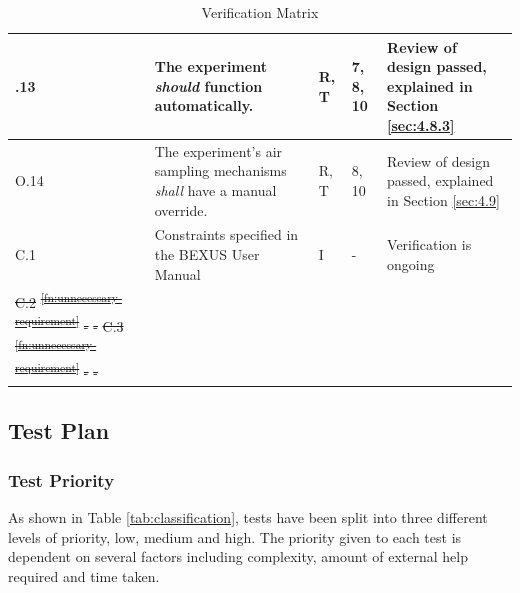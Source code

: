\documentclass[a4paper,12pt,twoside]{article}
\providecommand{\DIFaddtex}[1]{{\protect\color{blue}\uwave{#1}}} %
\providecommand{\DIFdeltex}[1]{{\protect\color{red}\sout{#1}}}                      %
\providecommand{\DIFaddbegin}{} %
\providecommand{\DIFaddend}{} %
\providecommand{\DIFdelbegin}{} %
\providecommand{\DIFdelend}{} %
\providecommand{\DIFadd}[1]{\texorpdfstring{\DIFaddtex{#1}}{#1}} %
\providecommand{\DIFdel}[1]{\texorpdfstring{\DIFdeltex{#1}}{}} %
\newcommand{\DIFscaledelfig}{0.5}
\newlength{\DIFdelgraphicswidth} %
\newlength{\DIFdelgraphicsheight} %
\newcommand{\DIFaddincludegraphics}[2][]{{\color{blue}\fbox{\DIFOincludegraphics[#1]{#2}}}} %
\newcommand{\DIFdelincludegraphics}[2][]{%
\sbox{\DIFdelgraphicsbox}{\DIFOincludegraphics[#1]{#2}}%
\settoboxwidth{\DIFdelgraphicswidth}{\DIFdelgraphicsbox} %
\settoboxtotalheight{\DIFdelgraphicsheight}{\DIFdelgraphicsbox} %
\scalebox{\DIFscaledelfig}{%
\parbox[b]{\DIFdelgraphicswidth}{\usebox{\DIFdelgraphicsbox}\\[-\baselineskip] \rule{\DIFdelgraphicswidth}{0em}}\llap{\resizebox{\DIFdelgraphicswidth}{\DIFdelgraphicsheight}{%
\setlength{\unitlength}{\DIFdelgraphicswidth}%
\begin{picture}(1,1)%
\thicklines\linethickness{2pt} %
{\color[rgb]{1,0,0}\put(0,0){\framebox(1,1){}}}%
{\color[rgb]{1,0,0}\put(0,0){\line( 1,1){1}}}%
{\color[rgb]{1,0,0}\put(0,1){\line(1,-1){1}}}%
\end{picture}%
}\hspace*{3pt}}} %
} %
\DeclareRobustCommand{\DIFaddbegin}{\DIFOaddbegin \let\includegraphics\DIFaddincludegraphics} %
\DeclareRobustCommand{\DIFaddend}{\DIFOaddend \let\includegraphics\DIFOincludegraphics} %
\DeclareRobustCommand{\DIFdelbegin}{\DIFOdelbegin \let\includegraphics\DIFdelincludegraphics} %
\DeclareRobustCommand{\DIFdelend}{\DIFOaddend \let\includegraphics\DIFOincludegraphics} %
\begin{document}
\begin{longtable}[]{|m{}| m{} |m{} |m{}|m{}|}
\DIFadd{O}\DIFaddend .13 & The experiment \textit{should} function automatically.                                                           &      R, T        & 7, 8, 10            &    Review of design passed, explained in Section \ref{sec:4.8.3}    \\ \hline
O.14 & The experiment's air sampling mechanisms \textit{shall} have a manual override.                                                           &      R, T        & 8, 10            &    Review of design passed, explained in Section \ref{sec:4.9}    \\ \hline
C.1  & Constraints specified in the BEXUS User Manual                                                                                                                          &       I       & -            & Verification is ongoing     \\ \hline
\DIFdelbegin \DIFdel{C.2  }%
\DIFdel{\textsuperscript{\ref{fn:unnecessary-requirement}}                                }%
\DIFdel{-        }%
\DIFdel{-            }%
\DIFdel{C.3  }%
\DIFdel{\textsuperscript{\ref{fn:unnecessary-requirement}}                                                                                                                                                 }%
\DIFdel{-        }%
\DIFdel{-            }%
\DIFdelend 

\caption{Verification Matrix\DIFaddbegin \DIFadd{.}\DIFaddend }
\label{tab:var-mat}
\end{longtable}
\raggedbottom
\pagebreak
\subsection{Test Plan}

\subsubsection{Test Priority} \DIFaddbegin \label{sec:5.2.1-testpriority}
\DIFaddend As shown in Table \ref{tab:classification}, tests have been split into three different levels of priority, low, medium and high. The priority given to each test is dependent on several factors including complexity, amount of external help required and time taken. 
\end{document}
